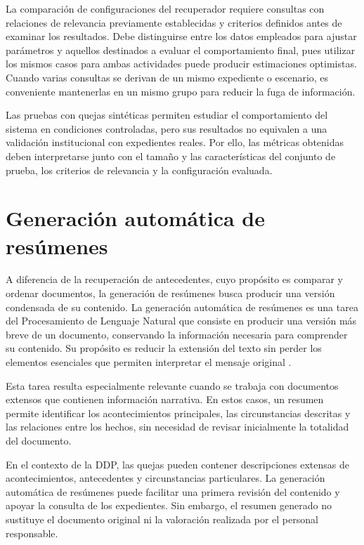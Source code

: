 La comparación de configuraciones del recuperador requiere consultas con relaciones de relevancia previamente establecidas y criterios definidos antes de examinar los resultados. Debe distinguirse entre los datos empleados para ajustar parámetros y aquellos destinados a evaluar el comportamiento final, pues utilizar los mismos casos para ambas actividades puede producir estimaciones optimistas. Cuando varias consultas se derivan de un mismo expediente o escenario, es conveniente mantenerlas en un mismo grupo para reducir la fuga de información.

Las pruebas con quejas sintéticas permiten estudiar el comportamiento del sistema en condiciones controladas, pero sus resultados no equivalen a una validación institucional con expedientes reales. Por ello, las métricas obtenidas deben interpretarse junto con el tamaño y las características del conjunto de prueba, los criterios de relevancia y la configuración evaluada.

\section{Generación automática de resúmenes}
\label{sec:generacion_resumenes}

A diferencia de la recuperación de antecedentes, cuyo propósito es comparar y ordenar documentos, la generación de resúmenes busca producir una versión condensada de su contenido. La generación automática de resúmenes es una tarea del Procesamiento de Lenguaje Natural que consiste en producir una versión más breve de un documento, conservando la información necesaria para comprender su contenido. Su propósito es reducir la extensión del texto sin perder los elementos esenciales que permiten interpretar el mensaje original \cite{jurafsky2023slp}.

Esta tarea resulta especialmente relevante cuando se trabaja con documentos extensos que contienen información narrativa. En estos casos, un resumen permite identificar los acontecimientos principales, las circunstancias descritas y las relaciones entre los hechos, sin necesidad de revisar inicialmente la totalidad del documento.

En el contexto de la DDP, las quejas pueden contener descripciones extensas de acontecimientos, antecedentes y circunstancias particulares. La generación automática de resúmenes puede facilitar una primera revisión del contenido y apoyar la consulta de los expedientes. Sin embargo, el resumen generado no sustituye el documento original ni la valoración realizada por el personal responsable.

